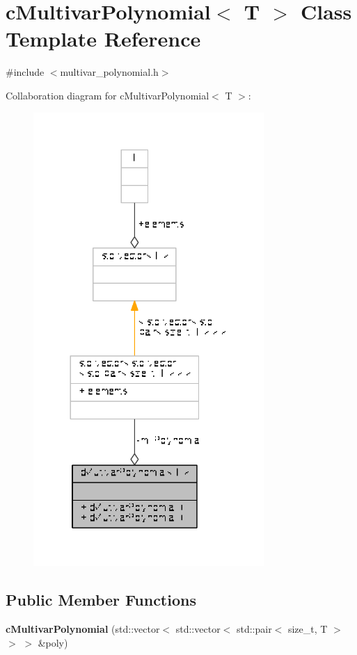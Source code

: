 \hypertarget{classcMultivarPolynomial}{\section{c\-Multivar\-Polynomial$<$ T $>$ Class Template Reference}
\label{classcMultivarPolynomial}
}


{\ttfamily \#include $<$multivar\-\_\-polynomial.\-h$>$}



Collaboration diagram for c\-Multivar\-Polynomial$<$ T $>$\-:
\nopagebreak
\begin{figure}[H]
\begin{center}
\leavevmode
\includegraphics[width=248pt]{classcMultivarPolynomial__coll__graph}
\end{center}
\end{figure}
\subsection*{Public Member Functions}
\begin{DoxyCompactItemize}
\item 
\hypertarget{classcMultivarPolynomial_a2389964d548cd22f0c214bc09a868b63}{{\bfseries c\-Multivar\-Polynomial} (std\-::vector$<$ std\-::vector$<$ std\-::pair$<$ size\-\_\-t, T $>$ $>$ $>$ \&poly)}\label{classcMultivarPolynomial_a2389964d548cd22f0c214bc09a868b63}

\end{DoxyCompactItemize}
